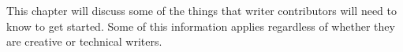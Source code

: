 
This chapter will discuss some of the things that writer contributors will need to know to get started. Some of this information applies regardless of whether they are creative or technical writers.



\StopChapter

